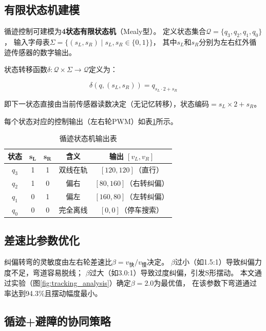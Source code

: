 \documentclass[12pt,a4paper]{ctexart}
\begin{document}
\subsection{有限状态机建模}

循迹控制可建模为\textbf{4状态有限状态机}（Mealy型）。
定义状态集合$\mathcal{Q} = \{q_3, q_2, q_1, q_0\}$，
输入字母表$\Sigma = \{(s_L, s_R) \mid s_L, s_R \in \{0,1\}\}$，
其中$s_L$和$s_R$分别为左右红外循迹传感器的数字输出。

状态转移函数$\delta: \mathcal{Q} \times \Sigma \to \mathcal{Q}$定义为：

\begin{equation}
\delta(q, (s_L, s_R)) = q_{s_L \cdot 2 + s_R}
\label{eq:fsm_transition}
\end{equation}

即下一状态直接由当前传感器读数决定（无记忆转移），状态编码$= s_L \times 2 + s_R$。

每个状态对应的控制输出（左右轮PWM）如表\ref{tab:fsm}所示。

\begin{table}[H]
\centering
\caption{循迹状态机输出表}
\label{tab:fsm}
\begin{tabular}{ccccc}
\toprule
\textbf{状态} & $\bm{s_L}$ & $\bm{s_R}$ & \textbf{含义} & \textbf{输出} $[v_L, v_R]$ \\
\midrule
$q_3$ & 1 & 1 & 双线在轨 & $[120, 120]$（直行）\\
$q_2$ & 1 & 0 & 偏右 & $[80, 160]$（右转纠偏）\\
$q_1$ & 0 & 1 & 偏左 & $[160, 80]$（左转纠偏）\\
$q_0$ & 0 & 0 & 完全离线 & $[0, 0]$（停车搜索）\\
\bottomrule
\end{tabular}
\end{table}

\subsection{差速比参数优化}

纠偏转弯的灵敏度由左右轮差速比$\beta = v_{\text{快}} / v_{\text{慢}}$决定。
$\beta$过小（如1.5:1）导致纠偏力度不足，弯道容易脱线；
$\beta$过大（如3.0:1）导致过度纠偏，引发S形摆动。
本文通过实验（图\ref{fig:tracking_analysis}）确定$\beta = 2.0$为最优值，
在该参数下弯道通过率达到94.3\%且摆动幅度最小。

\subsection{循迹+避障的协同策略}
\end{document}
